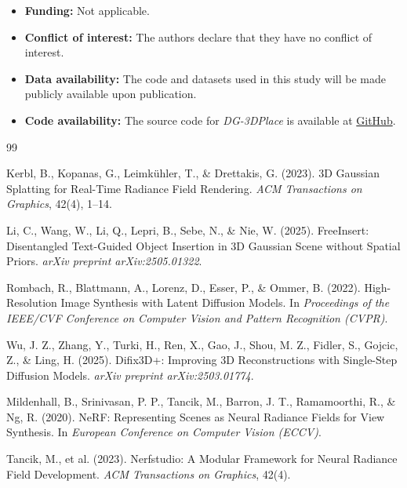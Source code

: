 \documentclass[pdflatex,sn-mathphys-num]{sn-jnl}%
\theoremstyle{thmstyleone}%
\theoremstyle{thmstyletwo}%
\theoremstyle{thmstylethree}%
\begin{document}
\begin{itemize}
\item \textbf{Funding:} Not applicable.
\item \textbf{Conflict of interest:} The authors declare that they have no conflict of interest.
\item \textbf{Data availability:} The code and datasets used in this study will be made publicly available upon publication.
\item \textbf{Code availability:} The source code for \textit{DG-3DPlace} is available at \href{https://github.com/RealEstateGen/DG-3DPLACE}{GitHub}.
\end{itemize}

\begin{thebibliography}{99}

Kerbl, B., Kopanas, G., Leimkühler, T., \& Drettakis, G. (2023). 3D Gaussian Splatting for Real-Time Radiance Field Rendering. \textit{ACM Transactions on Graphics}, 42(4), 1–14.

Li, C., Wang, W., Li, Q., Lepri, B., Sebe, N., \& Nie, W. (2025). FreeInsert: Disentangled Text-Guided Object Insertion in 3D Gaussian Scene without Spatial Priors. \textit{arXiv preprint arXiv:2505.01322}.

Rombach, R., Blattmann, A., Lorenz, D., Esser, P., \& Ommer, B. (2022). High-Resolution Image Synthesis with Latent Diffusion Models. In \textit{Proceedings of the IEEE/CVF Conference on Computer Vision and Pattern Recognition (CVPR)}.

Wu, J. Z., Zhang, Y., Turki, H., Ren, X., Gao, J., Shou, M. Z., Fidler, S., Gojcic, Z., \& Ling, H. (2025). Difix3D+: Improving 3D Reconstructions with Single-Step Diffusion Models. \textit{arXiv preprint arXiv:2503.01774}.

Mildenhall, B., Srinivasan, P. P., Tancik, M., Barron, J. T., Ramamoorthi, R., \& Ng, R. (2020). NeRF: Representing Scenes as Neural Radiance Fields for View Synthesis. In \textit{European Conference on Computer Vision (ECCV)}.

Tancik, M., et al. (2023). Nerfstudio: A Modular Framework for Neural Radiance Field Development. \textit{ACM Transactions on Graphics}, 42(4).


\end{thebibliography}
\end{document}
